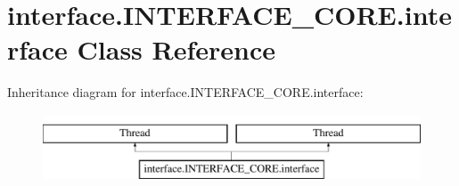 \hypertarget{classinterface_1_1INTERFACE__CORE_1_1interface}{}\section{interface.\+I\+N\+T\+E\+R\+F\+A\+C\+E\+\_\+\+C\+O\+R\+E.\+interface Class Reference}
\label{classinterface_1_1INTERFACE__CORE_1_1interface}
Inheritance diagram for interface.\+I\+N\+T\+E\+R\+F\+A\+C\+E\+\_\+\+C\+O\+R\+E.\+interface\+:\begin{figure}[H]
\begin{center}
\leavevmode
\includegraphics[height=2.000000cm]{classinterface_1_1INTERFACE__CORE_1_1interface}
\end{center}
\end{figure}
